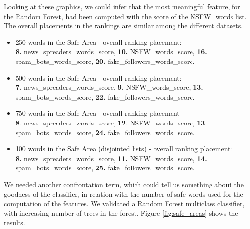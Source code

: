 Looking at these graphics, we could infer that the most meaningful feature, for the Random Forest, had been computed with the score of the NSFW\_words list.
The overall placements in the rankings are similar among the different datasets.
\begin{itemize}
	\item[\PencilRight]250 words in the Safe Area - overall ranking placement:\\
	\textbf{8.} news\_spreaders\_words\_score, \textbf{10.} NSFW\_words\_score, \textbf{16.} spam\_bots\_words\_score, \textbf{20.} fake\_followers\_words\_score.
	
	\item[\PencilRight]500 words in the Safe Area - overall ranking placement:\\
	\textbf{7.} news\_spreaders\_words\_score, \textbf{9.} NSFW\_words\_score, \textbf{13.} spam\_bots\_words\_score, \textbf{22.} fake\_followers\_words\_score.
	
	\item[\PencilRight]750 words in the Safe Area - overall ranking placement\\
	\textbf{8.} news\_spreaders\_words\_score, \textbf{12.} NSFW\_words\_score, \textbf{13.} spam\_bots\_words\_score, \textbf{24.} fake\_followers\_words\_score.
	
	\item[\PencilRight]100 words in the Safe Area (disjointed lists) - overall ranking placement:\\
	\textbf{8.} news\_spreaders\_words\_score, \textbf{11.} NSFW\_words\_score, \textbf{14.} spam\_bots\_words\_score, \textbf{25.} fake\_followers\_words\_score.
\end{itemize}

We needed another confrontation term, which could tell us something about the goodness of the classifier, in relation with the number of safe words used for the computation of the features.
We validated a Random Forest multiclass classifier, with increasing number of trees in the forest. Figure \ref{fig:safe_areas} shows the results.


